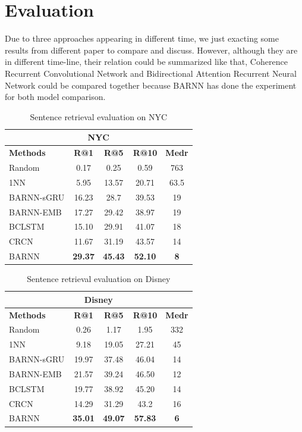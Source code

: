 \documentclass[11pt]{article}
\begin{document}
\section{Evaluation}
Due to three approaches appearing in different time, we just exacting some results from different paper to compare and discuss. However, although they are in different time-line, their relation could be summarized like that, Coherence Recurrent Convolutional Network and Bidirectional Attention Recurrent Neural Network could be compared together because BARNN has done the experiment for both model comparison. 

\begin{table}[h]
\small
\centering
\begin{tabular}{l|c|c|c|c}
\hline 
\multicolumn{5}{c}{NYC} \\
\hline
\bf Methods & \bf R@1 & \bf R@5 & \bf R@10 & \bf Medr \\ 
\hline
Random  & 0.17  & 0.25 & 0.59 & 763 \\
1NN  & 5.95  & 13.57 & 20.71 & 63.5 \\
BARNN-sGRU  & 16.23  & 28.7 & 39.53 & 19 \\
BARNN-EMB  & 17.27  & 29.42 & 38.97 & 19 \\
BCLSTM  & 15.10  & 29.91 & 41.07 & 18 \\
CRCN  & 11.67  & 31.19 & 43.57 & 14 \\
\hline
BARNN  & \bf 29.37  & \bf 45.43 & \bf 52.10 & \bf 8 \\
\hline
\end{tabular}
\caption{\label{tb:NYC} Sentence retrieval evaluation on NYC \cite{liu2017let}}
\end{table}

\begin{table}[h]
\small
\centering
\begin{tabular}{l|c|c|c|c}
\hline 
\multicolumn{5}{c}{Disney} \\
\hline
\bf Methods & \bf R@1 & \bf R@5 & \bf R@10 & \bf Medr \\ 
\hline
Random  & 0.26 &1.17 &1.95 &332 \\
1NN  & 9.18 &19.05 &27.21 &45 \\
BARNN-sGRU  & 19.97 &37.48 &46.04 &14 \\
BARNN-EMB  & 21.57 &39.24 &46.50 &12 \\
BCLSTM  & 19.77 &38.92 &45.20 &14 \\
CRCN  & 14.29 &31.29 &43.2 &16 \\
\hline
BARNN  & \bf 35.01 & \bf 49.07 & \bf 57.83 & \bf 6 \\
\hline
\end{tabular}
\caption{\label{tb:Disney} Sentence retrieval evaluation on Disney \cite{liu2017let}}
\end{table}
\end{document}
